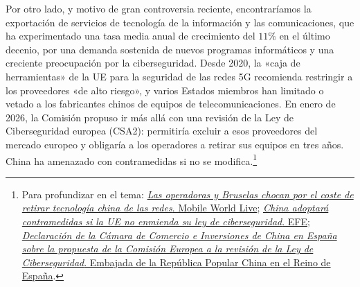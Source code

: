 \documentclass[10pt,a4paper]{article}
\begin{document}
Por otro lado, y motivo de gran controversia reciente, encontraríamos la exportación de servicios de tecnología de la información y las comunicaciones, que ha experimentado una tasa media anual de crecimiento del $11\%$ en el último decenio, por una demanda sostenida de nuevos programas informáticos y una creciente preocupación por la ciberseguridad. Desde 2020, la «caja de herramientas» de la UE para la seguridad de las redes 5G recomienda restringir a los proveedores «de alto riesgo», y varios Estados miembros han limitado o vetado a los fabricantes chinos de equipos de telecomunicaciones. En enero de 2026, la Comisión propuso ir más allá con una revisión de la Ley de Ciberseguridad europea (CSA2): permitiría excluir a esos proveedores del mercado europeo y obligaría a los operadores a retirar sus equipos en tres años. China ha amenazado con contramedidas si no se modifica.\footnote{%
    Para profundizar en el tema: \href{https://www.mobileworldlive.com/spanish/las-operadoras-y-bruselas-chocan-por-el-coste-de-retirar-tecnologia-china-de-las-redes/}{\textit{Las operadoras y Bruselas chocan por el coste de retirar tecnología china de las redes}. Mobile World Live}; \href{https://efe.com/euro-efe/2026-04-20/ue-china-5/}{\textit{China adoptará contramedidas si la UE no enmienda su ley de ciberseguridad}. EFE}; \href{https://es.china-embassy.gov.cn/esp/wjyw/202605/t20260512_11909281.htm}{\textit{Declaración de la Cámara de Comercio e Inversiones de China en España sobre la propuesta de la Comisión Europea a la revisión de la Ley de Ciberseguridad}. Embajada de la República Popular China en el Reino de España}.
}
\end{document}

